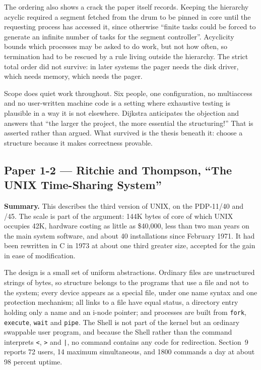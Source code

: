 The ordering also shows a crack the paper itself records. Keeping the hierarchy acyclic
required a segment fetched from the drum to be pinned in core until the requesting
process has accessed it, since otherwise ``finite tasks could be forced to generate an
infinite number of tasks for the segment controller''. Acyclicity bounds which processes
may be asked to do work, but not how often, so termination had to be rescued by a rule
living outside the hierarchy. The strict total order did not survive: in later systems
the pager needs the disk driver, which needs memory, which needs the pager.

Scope does quiet work throughout. Six people, one configuration, no multiaccess and no
user-written machine code is a setting where exhaustive testing is plausible in a way it
is not elsewhere. Dijkstra anticipates the objection and answers that ``the larger the
project, the more essential the structuring!'' That is asserted rather than argued. What
survived is the thesis beneath it: choose a structure because it makes correctness
provable.

\subsection*{Paper 1-2 --- Ritchie and Thompson, ``The UNIX Time-Sharing System''}
\label{p3:sec:unix}

\textbf{Summary.}
This describes the third version of UNIX, on the PDP-11/40 and /45. The scale is part of
the argument: 144K bytes of core of which UNIX occupies 42K, hardware costing as little
as \$40{,}000, less than two man years on the main system software, and about 40
installations since February 1971. It had been rewritten in C in 1973 at about one third
greater size, accepted for the gain in ease of modification.

The design is a small set of uniform abstractions. Ordinary files are unstructured
strings of bytes, so structure belongs to the programs that use a file and not to the
system; every device appears as a special file, under one name syntax and one protection
mechanism; all links to a file have equal status, a directory entry holding only a name
and an i-node pointer; and processes are built from \texttt{fork}, \texttt{execute},
\texttt{wait} and \texttt{pipe}. The Shell is not part of the kernel but an ordinary
swappable user program, and because the Shell rather than the command interprets
\texttt{<}, \texttt{>} and \texttt{|}, no command contains any code for redirection.
Section~9 reports 72 users, 14 maximum simultaneous, and 1800 commands a day at about 98
percent uptime.

